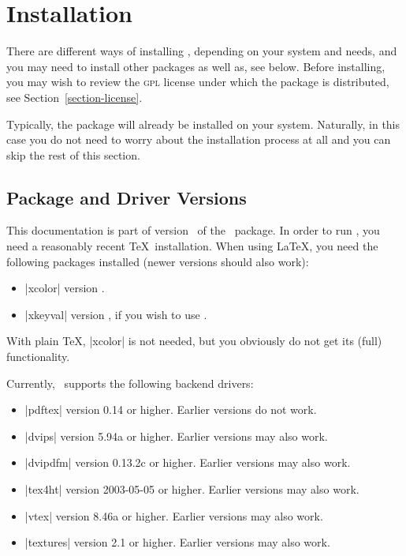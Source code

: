 %


\section{Installation}

There are different ways of installing \pgfname, depending
on your system and needs, and you may need to install other
packages as well as, see below. Before installing, you may wish to
review the \textsc{gpl} license under which the package is
distributed, see Section~\ref{section-license}. 

Typically, the package will already be installed on your
system. Naturally, in this case you do not need to worry about the
installation process at all and you can skip the rest of this
section. 


\subsection{Package and Driver Versions}

This documentation is part of version \pgfversion\ of the \pgfname\
package. In order to run \pgfname, you need a reasonably recent 
\TeX\ installation. When using \LaTeX, you need the following packages
installed (newer versions should also work):
\begin{itemize}
\item
  |xcolor| version \xcolorversion.
\item
  |xkeyval| version \xkeyvalversion, if you wish to use \tikzname.
\end{itemize}
With plain \TeX, |xcolor| is not needed, but you obviously do not
get its (full) functionality. 

Currently, \pgfname\ supports the following backend drivers:
\begin{itemize}
\item
  |pdftex| version 0.14 or higher. Earlier versions do not work.
\item
  |dvips| version 5.94a or higher. Earlier versions may also work.
\item
  |dvipdfm| version 0.13.2c or higher. Earlier versions may also work.
\item
  |tex4ht| version 2003-05-05 or higher. Earlier versions may also work.
\item
  |vtex| version 8.46a or higher. Earlier versions may also work.
\item
  |textures| version 2.1 or higher. Earlier versions may also work.
\end{itemize}

